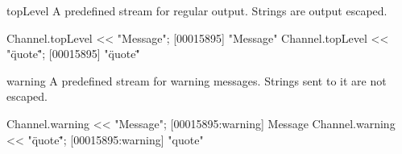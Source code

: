 \begin{urbiscriptapi}
\item[topLevel] A predefined stream for regular output.  Strings are
  output escaped.
\begin{urbiscript}
Channel.topLevel << "Message";
[00015895] "Message"
Channel.topLevel << "\"quote\"";
[00015895] "\"quote\""
\end{urbiscript}

\item[warning] A predefined stream for warning messages.  Strings sent
  to it are not escaped.
\begin{urbiscript}
Channel.warning << "Message";
[00015895:warning] Message
Channel.warning << "\"quote\"";
[00015895:warning] "quote"
\end{urbiscript}
\end{urbiscriptapi}

